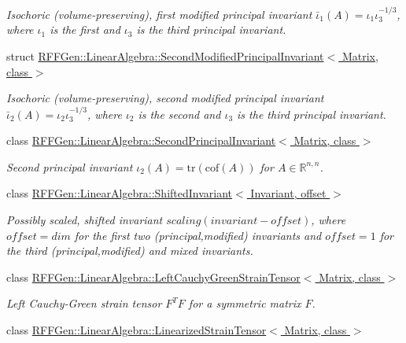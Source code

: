 \begin{DoxyCompactItemize}
\begin{DoxyCompactList}\small\item\em Isochoric (volume-\/preserving), first modified principal invariant $ \bar\iota_1(A)=\iota_1\iota_3^{-1/3} $, where $\iota_1$ is the first and $\iota_3$ is the third principal invariant. \end{DoxyCompactList}\item 
struct \hyperlink{structRFFGen_1_1LinearAlgebra_1_1SecondModifiedPrincipalInvariant}{R\-F\-F\-Gen\-::\-Linear\-Algebra\-::\-Second\-Modified\-Principal\-Invariant$<$ Matrix, class $>$}
\begin{DoxyCompactList}\small\item\em Isochoric (volume-\/preserving), second modified principal invariant $ \bar\iota_2(A)=\iota_2\iota_3^{-1/3} $, where $\iota_2$ is the second and $\iota_3$ is the third principal invariant. \end{DoxyCompactList}\item 
class \hyperlink{classRFFGen_1_1LinearAlgebra_1_1SecondPrincipalInvariant}{R\-F\-F\-Gen\-::\-Linear\-Algebra\-::\-Second\-Principal\-Invariant$<$ Matrix, class $>$}
\begin{DoxyCompactList}\small\item\em Second principal invariant $ \iota_2(A)=\mathrm{tr}(\mathrm{cof}(A)) $ for $A\in\mathbb{R}^{n,n}$. \end{DoxyCompactList}\item 
class \hyperlink{classRFFGen_1_1LinearAlgebra_1_1ShiftedInvariant}{R\-F\-F\-Gen\-::\-Linear\-Algebra\-::\-Shifted\-Invariant$<$ Invariant, offset $>$}
\begin{DoxyCompactList}\small\item\em Possibly scaled, shifted invariant $scaling (invariant - offset)$, where $offset = dim$ for the first two (principal,modified) invariants and $offset = 1$ for the third (principal,modified) and mixed invariants. \end{DoxyCompactList}\item 
class \hyperlink{classRFFGen_1_1LinearAlgebra_1_1LeftCauchyGreenStrainTensor}{R\-F\-F\-Gen\-::\-Linear\-Algebra\-::\-Left\-Cauchy\-Green\-Strain\-Tensor$<$ Matrix, class $>$}
\begin{DoxyCompactList}\small\item\em Left Cauchy-\/\-Green strain tensor $ F^T F $ for a symmetric matrix $ F $. \end{DoxyCompactList}\item 
class \hyperlink{classRFFGen_1_1LinearAlgebra_1_1LinearizedStrainTensor}{R\-F\-F\-Gen\-::\-Linear\-Algebra\-::\-Linearized\-Strain\-Tensor$<$ Matrix, class $>$}

\end{DoxyCompactItemize}
